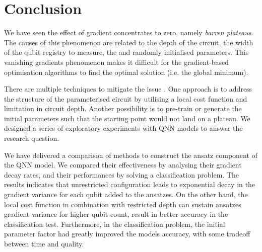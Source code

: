 \section{Conclusion}
We have seen the effect of gradient concentrates to zero, namely \emph{barren plateaus}.
The causes of this phenomenon are related to the depth of the circuit, the width of the qubit registry to measure, the and randomly initialised parameters.
This vanishing gradients phenomenon makes it difficult for the gradient-based optimisation algorithms to find the optimal solution (i.e. the global minimum).

There are multiple techniques to mitigate the issue \cite{cerezoCostFunctionDependent2021, skolikLayerwiseLearningQuantum2021, grantInitializationStrategyAddressing2019}.
One approach is to address the structure of the parameterised circuit by utilising a local cost function and limitation in circuit depth.
Another possibility is to pre-train or generate the initial parameters such that the starting point would not land on a plateau.
We designed a series of exploratory experiments with QNN models to answer the research question.

We have delivered a comparison of methods to construct the ansatz component of the QNN model.
We compared their effectiveness by analysing their gradient decay rates, and their performances by solving a classification problem.
The results indicates that unrestricted configuration leads to exponential decay in the gradient variance for each qubit added to the ansatzes.
On the other hand, the local cost function in combination with restricted depth can sustain ansatzes gradient variance for higher qubit count, result in better accuracy in the classification test.
Furthermore, in the classification problem, the initial parameter factor had greatly improved the models accuracy, with some tradeoff between time and quality.




